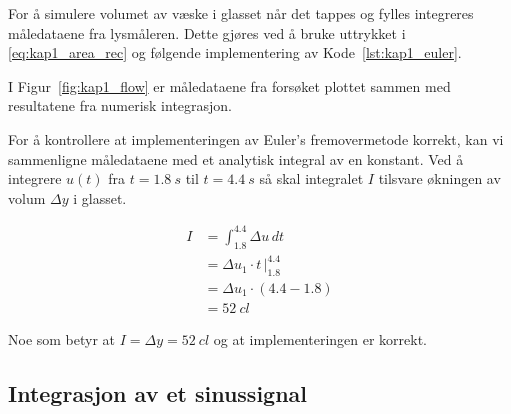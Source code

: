 \documentclass[main.tex]{subfiles}
\begin{document}
For å simulere volumet av væske i glasset når det tappes og fylles integreres måledataene fra lysmåleren. Dette gjøres ved å bruke uttrykket i \eqref{eq:kap1_area_rec} og følgende implementering av Kode~\ref{lst:kap1_euler}.



I Figur~\ref{fig:kap1_flow} er måledataene fra forsøket plottet sammen med resultatene fra numerisk integrasjon.



For å kontrollere at implementeringen av Euler's fremovermetode korrekt, kan vi sammenligne måledataene med et analytisk integral av en konstant. Ved å integrere $u(t)$ fra $t = \SI{1.8}{s}$ til $t = \SI{4.4}{s}$ så skal integralet $I$ tilsvare økningen av volum $\Delta y$ i glasset.

\begin{align}
    I & = \int_{1.8}^{4.4} \Delta u \, dt \nonumber         \\
      & = \Delta u_1 \cdot t \, \Big|_{1.8}^{4.4} \nonumber \\
      & = \Delta u_1 \cdot (4.4 - 1.8) \nonumber            \\
      & = \SI{52}{cl}
\end{align}

Noe som betyr at $I = \Delta y = \SI{52}{cl}$ og at implementeringen er korrekt.

\subsection{Integrasjon av et sinussignal}
\end{document}
